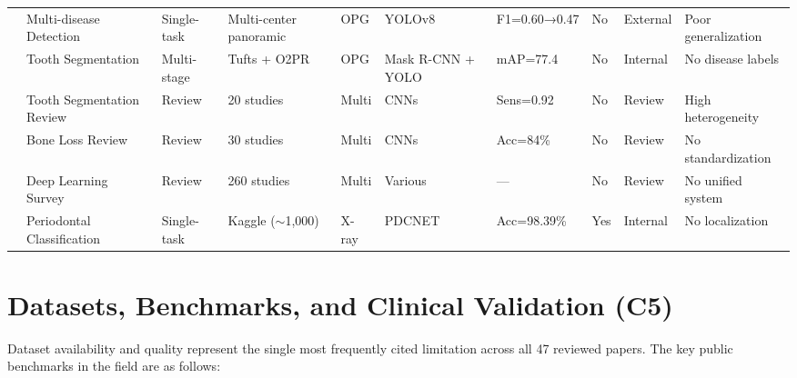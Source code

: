\documentclass[conference]{IEEEtran}
\begin{document}
\begin{table}[t]
\begin{tabular}{p{0.5cm} p{2.0cm} p{1.3cm} p{2.2cm} p{1.1cm} p{2.4cm} p{1.6cm} p{0.6cm} p{1.3cm} p{2.2cm}}
\cite{muresanu2024automating}    & Multi-disease Detection      & Single-task & Multi-center panoramic          & OPG      & YOLOv8                  & F1=0.60→0.47     & No      & External & Poor generalization \\
\cite{zhang2025reliable}         & Tooth Segmentation           & Multi-stage & Tufts + O2PR                    & OPG      & Mask R-CNN + YOLO       & mAP=77.4         & No      & Internal & No disease labels \\
\cite{bonfanti2025deep}          & Tooth Segmentation Review    & Review      & 20 studies                      & Multi    & CNNs                    & Sens=0.92        & No      & Review   & High heterogeneity \\
\cite{khubrani2025detection}     & Bone Loss Review             & Review      & 30 studies                      & Multi    & CNNs                    & Acc=84\%         & No      & Review   & No standardization \\
\cite{zhou2025deep}              & Deep Learning Survey         & Review      & 260 studies                     & Multi    & Various                 & ---              & No      & Review   & No unified system \\
\cite{bilal2024pdcnet}           & Periodontal Classification   & Single-task & Kaggle ($\sim$1,000)            & X-ray    & PDCNET                  & Acc=98.39\%      & Yes     & Internal & No localization \\
\end{tabular}
\end{table}
\section{Datasets, Benchmarks, and Clinical Validation (C5)}
\label{sec:datasets}

Dataset availability and quality represent the single most frequently
cited limitation across all 47 reviewed papers. The key public
benchmarks in the field are as follows:
\end{document}
